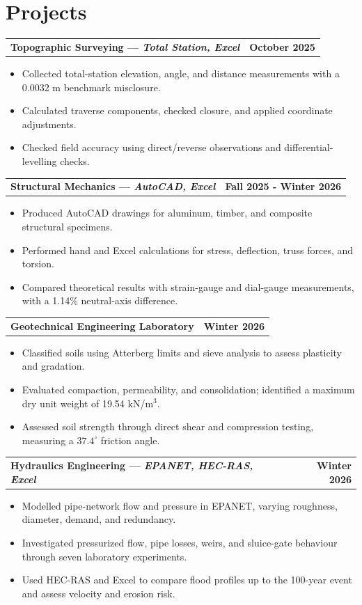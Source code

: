 \documentclass[11pt]{article}
\newcommand{\entrySingle}[2]{%
  \begin{tabularx}{\textwidth}{X r}
    \textbf{#1} & \textbf{#2}
  \end{tabularx}\vspace{-2pt}
}
\newcommand{\tightItem}[1]{\item \small #1}
\begin{document}
\section*{Projects}
\entrySingle{Topographic Surveying \;---\; \textit{Total Station, Excel}}{October 2025}
\begin{itemize}
  \tightItem{Collected total-station elevation, angle, and distance measurements with a 0.0032 m benchmark misclosure.}
  \tightItem{Calculated traverse components, checked closure, and applied coordinate adjustments.}
  \tightItem{Checked field accuracy using direct/reverse observations and differential-levelling checks.}
\end{itemize}

\entrySingle{Structural Mechanics \;---\; \textit{AutoCAD, Excel}}{Fall 2025 - Winter 2026}
\begin{itemize}
  \tightItem{Produced AutoCAD drawings for aluminum, timber, and composite structural specimens.}
  \tightItem{Performed hand and Excel calculations for stress, deflection, truss forces, and torsion.}
  \tightItem{Compared theoretical results with strain-gauge and dial-gauge measurements, with a 1.14\% neutral-axis difference.}
\end{itemize}

\entrySingle{Geotechnical Engineering Laboratory}{Winter 2026}
\begin{itemize}
  \tightItem{Classified soils using Atterberg limits and sieve analysis to assess plasticity and gradation.}
  \tightItem{Evaluated compaction, permeability, and consolidation; identified a maximum dry unit weight of 19.54 kN/m$^3$.}
  \tightItem{Assessed soil strength through direct shear and compression testing, measuring a $37.4^\circ$ friction angle.}
\end{itemize}

\entrySingle{Hydraulics Engineering \;---\; \textit{EPANET, HEC-RAS, Excel}}{Winter 2026}
\begin{itemize}
  \tightItem{Modelled pipe-network flow and pressure in EPANET, varying roughness, diameter, demand, and redundancy.}
  \tightItem{Investigated pressurized flow, pipe losses, weirs, and sluice-gate behaviour through seven laboratory experiments.}
  \tightItem{Used HEC-RAS and Excel to compare flood profiles up to the 100-year event and assess velocity and erosion risk.}
\end{itemize}

\end{document}
